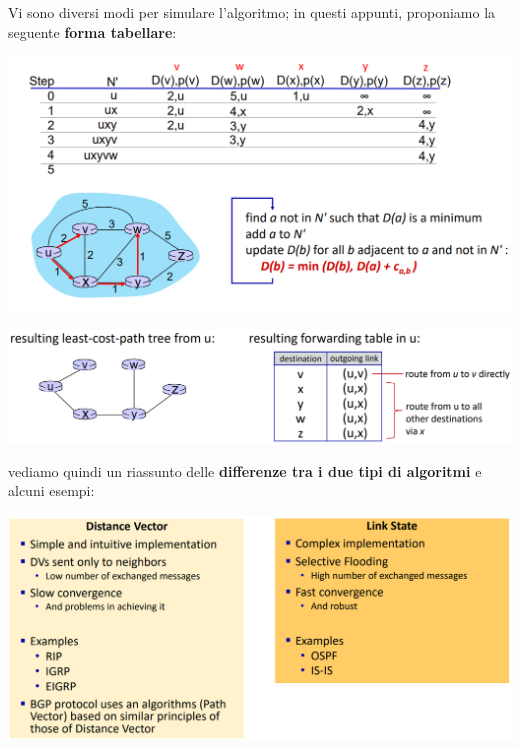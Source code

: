 \documentclass[12pt]{article}
\begin{document}
Vi sono diversi modi per simulare l'algoritmo; in questi appunti, proponiamo la seguente \textbf{forma tabellare}:
\begin{center}
    \includegraphics[width =1\linewidth]{Images/108.png}
\end{center}
\begin{center}
    \includegraphics[width =1\linewidth]{Images/109.png}
\end{center}
vediamo quindi un riassunto delle \textbf{differenze tra i due tipi di algoritmi} e alcuni esempi:
\begin{center}
    \includegraphics[width =1\linewidth]{Images/110.png}
\end{center}
\end{document}
